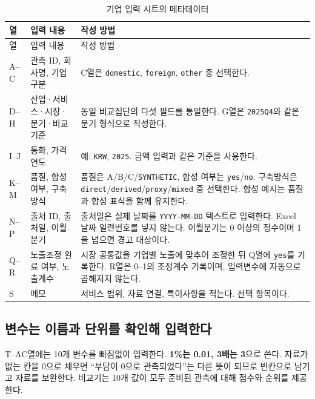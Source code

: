 \begin{longtable}{@{}L{2.0cm}L{4.2cm}L{8.5cm}@{}}
\caption{기업 입력 시트의 메타데이터}\label{tab:simulator-metadata}\\
\toprule
{}
열 & 입력 내용 & 작성 방법 \\
\midrule
\endfirsthead
\toprule
{}
열 & 입력 내용 & 작성 방법 \\
\midrule
\endhead
\bottomrule
\endfoot
A--C & 관측 ID, 회사명, 기업 구분 & C열은 \texttt{domestic}, \texttt{foreign}, \texttt{other} 중 선택한다. \\
D--H & 산업·서비스·시장·분기·비교기준 & 동일 비교집단의 다섯 필드를 통일한다. G열은 \texttt{2025Q4}와 같은 분기 형식으로 작성한다. \\
I--J & 통화, 가격연도 & 예: \texttt{KRW}, \texttt{2025}. 금액 입력과 같은 기준을 사용한다. \\
K--M & 품질, 합성 여부, 구축방식 & 품질은 A/B/C/\texttt{SYNTHETIC}, 합성 여부는 \texttt{yes}/\texttt{no}. 구축방식은 \texttt{direct}/\texttt{derived}/\texttt{proxy}/\texttt{mixed} 중 선택한다. 합성 예시는 품질과 합성 표식을 함께 유지한다. \\
N--P & 출처 ID, 출처일, 이월분기 & 출처일은 실제 날짜를 \texttt{YYYY-MM-DD} 텍스트로 입력한다. Excel 날짜 일련번호를 넣지 않는다. 이월분기는 0 이상의 정수이며 1을 넘으면 경고 대상이다. \\
Q--R & 노출조정 완료 여부, 노출계수 & 시장 공통값을 기업별 노출에 맞추어 조정한 뒤 Q열에 \texttt{yes}를 기록한다. R열은 0--1의 조정계수 기록이며, 입력변수에 자동으로 곱해지지 않는다. \\
S & 메모 & 서비스 범위, 자료 연결, 특이사항을 적는다. 선택 항목이다. \\
\end{longtable}

\subsection{변수는 이름과 단위를 확인해 입력한다}

T--AC열에는 10개 변수를 빠짐없이 입력한다. \textbf{1\%는 0.01, 3배는 3}으로 쓴다. 자료가 없는 칸을 0으로 채우면 ``부담이 0으로 관측되었다''는 다른 뜻이 되므로 빈칸으로 남기고 자료를 보완한다. 비교기는 10개 값이 모두 준비된 관측에 대해 점수와 순위를 제공한다.

